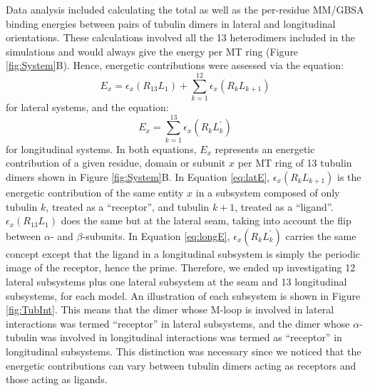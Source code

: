 \documentclass[11pt]{report}
\begin{document}
Data analysis included calculating the total as well as 
the per-residue MM/GBSA binding energies \cite{Kollman2000} between pairs of tubulin dimers in lateral and longitudinal orientations. These calculations
involved all the 13 heterodimers included in the simulations and would 
always give the energy per MT ring (Figure \ref{fig:System}B). Hence, energetic contributions
were assessed via the equation:
\begin{equation}
\label{eq:latE}
E_x = \epsilon_x(R_{13}L_{1}) + \sum\limits_{k=1}^{12} \epsilon_x(R_{k}L_{k+1})  
\end{equation}
for lateral systems, and the equation:
\begin{equation}
\label{eq:longE}
E_x = \sum\limits_{k=1}^{13} \epsilon_x(R_{k}L_{k}^{\prime})
\end{equation}
for longitudinal
systems. In both equations, $E_{x}$ represents an energetic contribution 
of a given residue, domain or subunit $x$ per MT ring of 13 tubulin dimers
shown in Figure \ref{fig:System}B. In Equation \ref{eq:latE}, $\epsilon_{x}(R_{k}L_{k+1})$ 
is the energetic contribution of the same entity $x$ in a subsystem composed
of only tubulin $k$, treated as a ``receptor'', and tubulin $k+1$, treated as a ``ligand''. $\epsilon_x(R_{13}L_{1})$ does the same but at the lateral seam, taking
into account the flip between $\alpha$- and $\beta$-subunits.
In Equation \ref{eq:longE},
$\epsilon_{x}(R_{k}L_{k}^{\prime})$ carries the same concept except that the
ligand in a longitudinal subsystem is simply the periodic image of the receptor,
hence the prime.
Therefore, we ended up investigating 12 lateral subsystems plus one lateral subsystem
at the seam and 13 longitudinal subsystems, for each model. An illustration 
of each subsystem is shown in Figure \ref{fig:TubInt}.
This means
that the dimer whose M-loop is involved in lateral interactions
was termed ``receptor'' in lateral subsystems, and the dimer whose
$\alpha$-tubulin was involved in longitudinal interactions
was termed as ``receptor'' in longitudinal subsystems. This 
distinction was necessary since we noticed that the 
energetic contributions can vary between tubulin dimers acting as receptors and those acting
as ligands.
\end{document}
